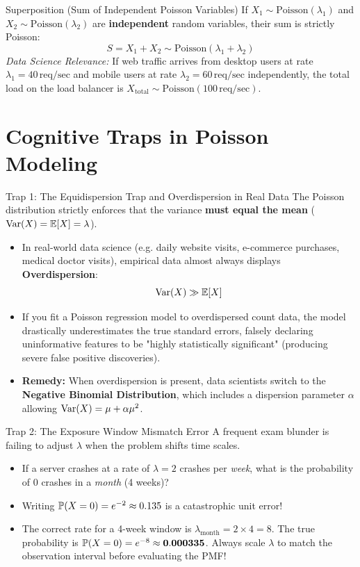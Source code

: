 \begin{theorembox}{Superposition (Sum of Independent Poisson Variables)}
If $X_1 \sim \text{Poisson}(\lambda_1)$ and $X_2 \sim \text{Poisson}(\lambda_2)$ are \textbf{independent} random variables, their sum is strictly Poisson:
$$S = X_1 + X_2 \sim \text{Poisson}(\lambda_1 + \lambda_2)$$
\textit{Data Science Relevance:} If web traffic arrives from desktop users at rate $\lambda_1 = 40\,\text{req/sec}$ and mobile users at rate $\lambda_2 = 60\,\text{req/sec}$ independently, the total load on the load balancer is $X_{\text{total}} \sim \text{Poisson}(100\,\text{req/sec})$.
\end{theorembox}

\section{Cognitive Traps in Poisson Modeling}

\begin{trapbox}{Trap 1: The Equidispersion Trap and Overdispersion in Real Data}
The Poisson distribution strictly enforces that the variance \textbf{must equal the mean} ($\Var(X) = \E[X] = \lambda$).
\begin{itemize}
    \item In real-world data science (e.g. daily website visits, e-commerce purchases, medical doctor visits), empirical data almost always displays \textbf{Overdispersion}:
    $$\Var(X) \gg \E[X]$$
    \item If you fit a Poisson regression model to overdispersed count data, the model drastically underestimates the true standard errors, falsely declaring uninformative features to be "highly statistically significant" (producing severe false positive discoveries).
    \item \textbf{Remedy:} When overdispersion is present, data scientists switch to the \textbf{Negative Binomial Distribution}, which includes a dispersion parameter $\alpha$ allowing $\Var(X) = \mu + \alpha \mu^2$.
\end{itemize}
\end{trapbox}

\begin{trapbox}{Trap 2: The Exposure Window Mismatch Error}
A frequent exam blunder is failing to adjust $\lambda$ when the problem shifts time scales.
\begin{itemize}
    \item If a server crashes at a rate of $\lambda = 2$ crashes per \emph{week}, what is the probability of 0 crashes in a \emph{month} (4 weeks)?
    \item Writing $\P(X = 0) = e^{-2} \approx 0.135$ is a catastrophic unit error!
    \item The correct rate for a 4-week window is $\lambda_{\text{month}} = 2 \times 4 = 8$. The true probability is $\P(X = 0) = e^{-8} \approx \mathbf{0.000335}$. Always scale $\lambda$ to match the observation interval before evaluating the PMF!
\end{itemize}
\end{trapbox}

